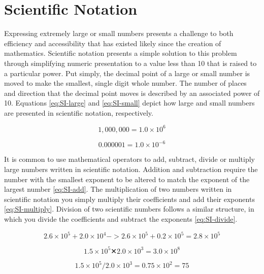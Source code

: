 \documentclass[
]{book}
\begin{document}
\section{Scientific Notation}\label{scientific-notation}

Expressing extremely large or small numbers presents a challenge to both efficiency and accessibility that has existed likely since the creation of mathematics. Scientific notation presents a simple solution to this problem through simplifying numeric presentation to a value less than 10 that is raised to a particular power. Put simply, the decimal point of a large or small number is moved to make the smallest, single digit whole number. The number of places and direction that the decimal point moves is described by an associated power of 10. Equations \eqref{eq:SI-large} and \eqref{eq:SI-small} depict how large and small numbers are presented in scientific notation, respectively.

\begin{equation}
1,000,000 = 1.0 × 10^{6} 
\label{eq:SI-large}
\end{equation}

\begin{equation}
0.000001 = 1.0 × 10 ^{-6} 
\label{eq:SI-small}
\end{equation}

It is common to use mathematical operators to add, subtract, divide or multiply large numbers written in scientific notation. Addition and subtraction require the number with the smallest exponent to be altered to match the exponent of the largest number \eqref{eq:SI-add}. The multiplication of two numbers written in scientific notation you simply multiply their coefficients and add their exponents \eqref{eq:SI-multiply}. Division of two scientific numbers follows a similar structure, in which you divide the coefficients and subtract the exponents \eqref{eq:SI-divide}.

\begin{equation}
2.6 × 10 ^{5} + 2.0 × 10 ^{4}   ->
2.6 × 10 ^{5} + 0.2 × 10 ^{5} = 2.8 × 10 ^{5} 
\label{eq:SI-add}
\end{equation}

\begin{equation}
1.5 × 10 ^{5} ✕ 2.0 × 10 ^{3} = 3.0 × 10 ^{8} 
\label{eq:SI-multiply}
\end{equation}

\begin{equation}
1.5 × 10 ^{5} / 2.0 × 10 ^{3} = 0.75 × 10 ^{2} = 75
\label{eq:SI-divide}
\end{equation}
\end{document}
